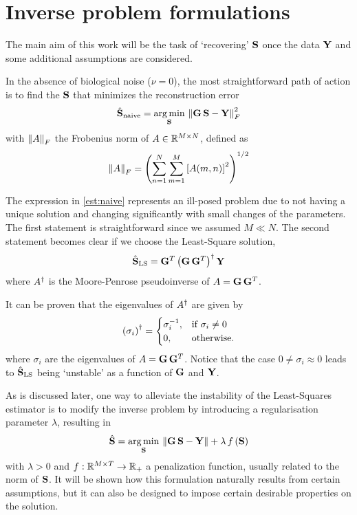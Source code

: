\section{Inverse problem formulations}

The main aim of this work will be the task of `recovering' $\mathbf{S}$ once the data $\mathbf{Y}$ and some additional assumptions are considered.

In the absence of biological noise ($\nu = 0$),
the most straightforward path of action is to find the $\mathbf{S}$ that minimizes the reconstruction error
\begin{equation}
\hat{\SA}_{\text{naive}} =
\argmin_{\SA}\, \nnorm{\G\, \SA- \Y}_F^2 %
\label{est:naive}
\end{equation}
with $\left\lVert A \right\rVert_F$ the Frobenius norm of $A\in \mathbb{R}^{M\times N}$, defined as
\begin{equation}
\left\lVert A \right\rVert_F =
\left( 
\sum_{n=1}^N \sum_{m=1}^M \left[ A(m,n) \right]^2
 \right)^{1/2}
\end{equation}

The expression in \eqref{est:naive} represents
an ill-posed problem due to not having a unique solution and changing significantly with small changes of the parameters.
%
The first statement is straightforward since we assumed $M\ll N$.
%
The second statement becomes clear if we choose the Least-Square solution,
\begin{equation}
\hat{\mathbf{S}}_{\text{LS}} =
\mathbf{G}^T \left( \mathbf{G}\, \mathbf{G}^T \right)^\dagger \mathbf{Y}
\end{equation}
where $A^\dagger$ is the Moore-Penrose pseudoinverse of $A=\mathbf{G}\, \mathbf{G}^T$.

It can be proven that the eigenvalues of $A^\dagger$ are given by
\begin{equation}
\left( \sigma_i \right)^\dagger =
\begin{cases}
\sigma_i^{-1}, &\text{if } \sigma_i\neq 0 \\
0, &\text{otherwise}.
\end{cases}
\end{equation}
where $\sigma_i$ are the eigenvalues of $A=\mathbf{G}\, \mathbf{G}^T$. 
%
Notice that the case $0\neq \sigma_i \approx 0$ leads to $\hat{\mathbf{S}}_{\text{LS}}$ being `unstable' as a function of $\mathbf{G}$ and $\mathbf{Y}$.

As is discussed later, one way to alleviate the instability of the Least-Squares estimator is to modify the inverse problem by introducing a regularisation parameter $\lambda$, resulting in
\begin{equation}
\hat{\mathbf{S}} = \operatorname*{arg\,min}_{\mathbf{S}}\, \left\lVert \mathbf{G}\, \mathbf{S} - \mathbf{Y} \right\rVert + \lambda\, f\left( \mathbf{S} \right)
\label{est:gral}
\end{equation}
with $\lambda>0$ and $f: \mathbb{R}^{M\times T} \rightarrow \mathbb{R}_+$ a penalization function, usually related to the norm of $\mathbf{S}$.
%
It will be shown how this formulation naturally results from certain assumptions, but it can also be designed to impose certain desirable properties on the solution.

